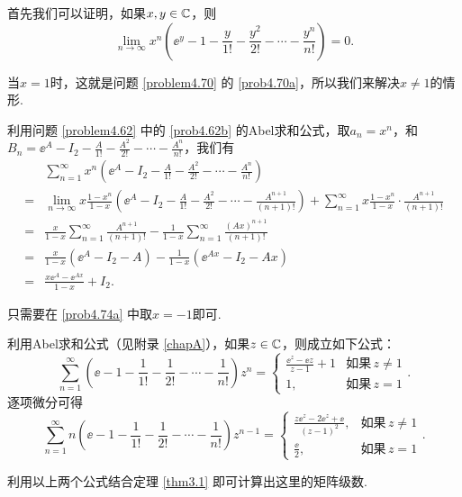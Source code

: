 \begin{solution}
  \begin{inparaenum}[(a)]
    \item 首先我们可以证明，如果$x,y\in\mathbb C$，则
    \[
      \lim_{n\to\infty}x^n \left( \ee^y - 1 - \frac y{1!} - \frac{y^2}{2!} - \cdots - \frac{y^n}{n!}\right) = 0.
    \]

    当$x=1$时，这就是问题 \ref{problem4.70} 的 \ref{prob4.70a}，所以我们来解决$x\ne1$的情形.

    利用问题 \ref{problem4.62} 中的 \ref{prob4.62b} 的Abel求和公式，取$a_n=x^n$，和$B_n=\ee^A- I_2 - \frac A{1!} - \frac{A^2}{2!} - \cdots - \frac{A^n}{n!}$，我们有
    \begin{align*}
      & \sum_{n=1}^\infty x^n \left( \ee^A- I_2 - \frac A{1!} - \frac{A^2}{2!} - \cdots - \frac{A^n}{n!} \right) \\
      = {}& \lim_{n\to\infty} x \frac{1-x^n}{1-x} \left( \ee^A- I_2 - \frac A{1!} - \frac{A^2}{2!} - \cdots - \frac{A^{n+1}}{(n+1)!} \right) + \sum_{n=1}^\infty x\frac{1-x^n}{1-x}\cdot \frac{A^{n+1}}{(n+1)!} \\
      = {}& \frac x{1-x} \sum_{n=1}^\infty \frac{A^{n+1}}{(n+1)!} - \frac1{1-x} \sum_{n=1}^\infty \frac{(Ax)^{n+1}}{(n+1)!} \\
      = {}& \frac x{1-x} (\ee^A - I_2 - A) - \frac1{1-x} (\ee^{Ax} - I_2 - Ax) \\
      = {}& \frac{x\ee^A-\ee^{Ax}}{1-x} + I_2.
    \end{align*}

  \item 只需要在 \ref{prob4.74a} 中取$x=-1$即可.
  \end{inparaenum}
\end{solution}

\begin{solution}
  利用Abel求和公式（见附录 \ref{chapA}），如果$z\in\mathbb C$，则成立如下公式：
  \[
    \sum_{n=1}^\infty \left( \ee -1 -\frac1{1!} - \frac1{2!} - \cdots - \frac1{n!} \right) z^n = \begin{cases}
      \frac{\ee^z - \ee z}{z-1} + 1 & \text{如果}\, z\ne 1 \\
      1, & \text{如果}\, z = 1
    \end{cases}.
  \]
  逐项微分可得
  \[
    \sum_{n=1}^\infty n \left( \ee -1 -\frac1{1!} - \frac1{2!} - \cdots - \frac1{n!} \right)z^{n-1} = \begin{cases}
      \frac{z\ee^z-2\ee^z+\ee}{(z-1)^2}, & \text{如果}\, z \ne 1 \\
      \frac{\ee}2, & \text{如果}\, z = 1
    \end{cases}.
  \]

  利用以上两个公式结合定理 \ref{thm3.1} 即可计算出这里的矩阵级数.
\end{solution}


